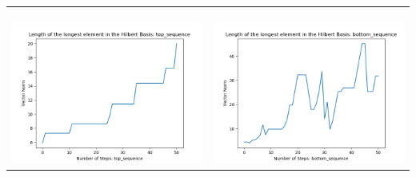 \documentclass[10pt]{article}
\begin{document}
\begin{tabular}{c|c}
\begin{minipage}{.45\textwidth}
\end{minipage} \\ \\
\hline \\
\begin{minipage}{.45\textwidth}
\includegraphics[width=\textwidth]{"DATA/5d/6 generators 2 bound G alternating/top_sequence LENGTH"}
\end{minipage} &
\begin{minipage}{.45\textwidth}
\includegraphics[width=\textwidth]{"DATA/5d/6 generators 2 bound G alternating/bottom_sequence LENGTH"}
\end{minipage}
\end{tabular}
\end{document}
